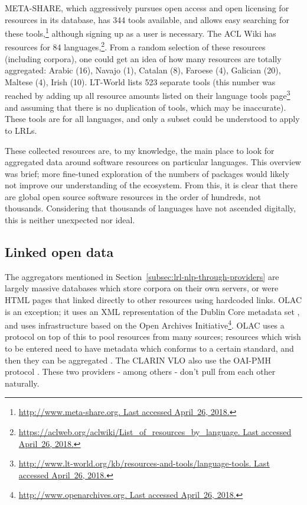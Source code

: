META-SHARE, which aggressively pursues open access and open licensing for resources in its database, has 344 tools available, and allows easy searching for these tools,\footnote{\href{http://www.meta-share.org/}{http://www.meta-share.org. Last accessed April~26, 2018.}} although signing up as a user is necessary. The ACL Wiki has resources for 84 languages,\footnote{\href{https://aclweb.org/aclwiki/List\_of\_resources\_by\_language}{https://aclweb.org/aclwiki/List\_of\_resources\_by\_language. Last accessed April~26, 2018.}}. From a random selection of these resources (including corpora), one could get an idea of how many resources are totally aggregated: Arabic (16), Navajo (1), Catalan (8), Faroese (4), Galician (20), Maltese (4), Irish (10). LT-World lists 523 separate tools (this number was reached by adding up all resource amounts listed on their language tools page\footnote{\href{http://www.lt-world.org/kb/resources-and-tools/language-tools/}{http://www.lt-world.org/kb/resources-and-tools/language-tools. Last accessed April~26, 2018.}} and assuming that there is no duplication of tools, which may be inaccurate). These tools are for all languages, and only a subset could be understood to apply to LRLs.

These collected resources are, to my knowledge, the main place to look for aggregated data around software resources on particular languages. This overview was brief; more fine-tuned exploration of the numbers of packages would likely not improve our understanding of the ecosystem. From this, it is clear that there are global open source software resources in the order of hundreds, not thousands. Considering that thousands of languages have not ascended digitally, this is neither unexpected nor ideal.

\subsection{Linked open data}
\label{subsec:lod}

The aggregators mentioned in Section~\ref{subsec:lrl-nlp-through-providers} are largely massive databases which store corpora on their own servers, or were HTML pages that linked directly to other resources using hardcoded links. OLAC is an exception; it uses an XML representation of the Dublin Core metadata set \citep{dublin1998dublin}, and uses infrastructure based on the Open Archives Initiative\footnote{\href{http://www.openarchives.org}{http://www.openarchives.org. Last accessed April~26, 2018.}}. OLAC uses a protocol on top of this to pool resources from many sources; resources which wish to be entered need to have metadata which conforms to a certain standard, and then they can be aggregated \citep{simons2001olac}. The CLARIN VLO \citep{mccrae2015one} also use the OAI-PMH protocol \citep{sompel2004resource, mccrae2015reconciling}. These two providers - among others - don't pull from each other naturally.

